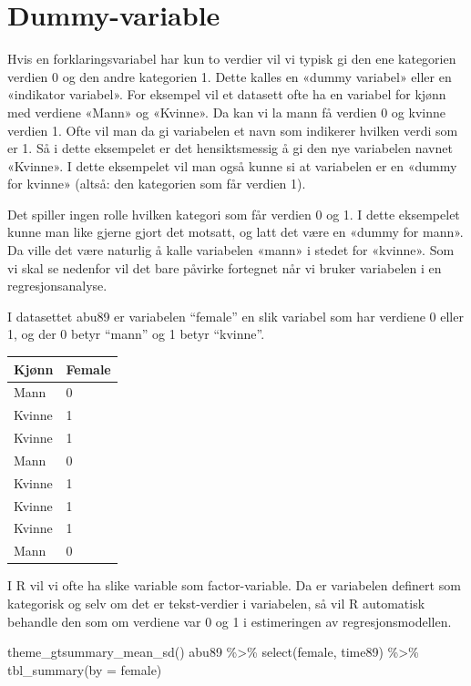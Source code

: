 \documentclass[
  letterpaper,
  DIV=11,
  numbers=noendperiod]{scrreprt}
\newenvironment{Shaded}{\begin{snugshade}}{\end{snugshade}}
\newcommand{\AttributeTok}[1]{\textcolor[rgb]{0.40,0.45,0.13}{#1}}
\newcommand{\FunctionTok}[1]{\textcolor[rgb]{0.28,0.35,0.67}{#1}}
\newcommand{\NormalTok}[1]{\textcolor[rgb]{0.00,0.23,0.31}{#1}}
\newcommand{\SpecialCharTok}[1]{\textcolor[rgb]{0.37,0.37,0.37}{#1}}
\theoremstyle{definition}
\theoremstyle{remark}
\begin{document}
\hypertarget{dummy-variable}{%
\section{Dummy-variable}\label{dummy-variable}}

Hvis en forklaringsvariabel har kun to verdier vil vi typisk gi den ene
kategorien verdien 0 og den andre kategorien 1. Dette kalles en «dummy
variabel» eller en «indikator variabel». For eksempel vil et datasett
ofte ha en variabel for kjønn med verdiene «Mann» og «Kvinne». Da kan vi
la mann få verdien 0 og kvinne verdien 1. Ofte vil man da gi variabelen
et navn som indikerer hvilken verdi som er 1. Så i dette eksempelet er
det hensiktsmessig å gi den nye variabelen navnet «Kvinne». I dette
eksempelet vil man også kunne si at variabelen er en «dummy for kvinne»
(altså: den kategorien som får verdien 1).

Det spiller ingen rolle hvilken kategori som får verdien 0 og 1. I dette
eksempelet kunne man like gjerne gjort det motsatt, og latt det være en
«dummy for mann». Da ville det være naturlig å kalle variabelen «mann» i
stedet for «kvinne». Som vi skal se nedenfor vil det bare påvirke
fortegnet når vi bruker variabelen i en regresjonsanalyse.

I datasettet abu89 er variabelen ``female'' en slik variabel som har
verdiene 0 eller 1, og der 0 betyr ``mann'' og 1 betyr ``kvinne''.

\begin{longtable}[]{@{}ll@{}}
\toprule()
Kjønn & Female \\
\midrule()
\endhead
Mann & 0 \\
Kvinne & 1 \\
Kvinne & 1 \\
Mann & 0 \\
Kvinne & 1 \\
Kvinne & 1 \\
Kvinne & 1 \\
Mann & 0 \\
\bottomrule()
\end{longtable}

I R vil vi ofte ha slike variable som factor-variable. Da er variabelen
definert som kategorisk og selv om det er tekst-verdier i variabelen, så
vil R automatisk behandle den som om verdiene var 0 og 1 i estimeringen
av regresjonsmodellen.

\begin{Shaded}
\begin{Highlighting}[]
\FunctionTok{theme\_gtsummary\_mean\_sd}\NormalTok{()}
\NormalTok{abu89 }\SpecialCharTok{\%\textgreater{}\%} 
  \FunctionTok{select}\NormalTok{(female, time89) }\SpecialCharTok{\%\textgreater{}\%} 
  \FunctionTok{tbl\_summary}\NormalTok{(}\AttributeTok{by =}\NormalTok{ female) }
\end{Highlighting}
\end{Shaded}
\end{document}
